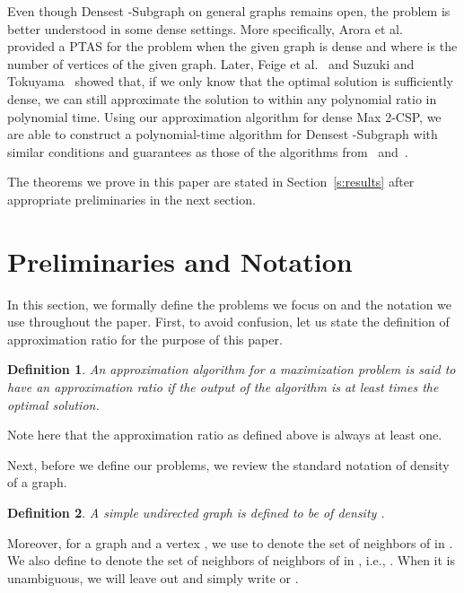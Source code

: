 \documentclass{article}
\newtheorem{definition}{Definition}
\begin{document}
Even though {\sc Densest -Subgraph} on general graphs remains open, the problem is better understood in some dense settings. More specifically, Arora et al.~\cite{AKK95} provided a PTAS for the problem when the given graph is dense and  where  is the number of vertices of the given graph. Later, Feige et al.~\cite{FPK01} and Suzuki and Tokuyama~\cite{ST05} showed that, if we only know that the optimal solution is sufficiently dense, we can still approximate the solution to within any polynomial ratio in polynomial time. Using our approximation algorithm for dense {\sc Max 2-CSP}, we are able to construct a polynomial-time algorithm for {\sc Densest -Subgraph} with similar conditions and guarantees as those of the algorithms from~\cite{FPK01} and~\cite{ST05}.

The theorems we prove in this paper are stated in Section~\ref{s:results} after appropriate preliminaries in the next section.

\section{Preliminaries and Notation}

In this section, we formally define the problems we focus on and the notation we use throughout the paper. First, to avoid confusion, let us state the definition of approximation ratio for the purpose of this paper. \\

\begin{definition}
  An approximation algorithm for a maximization problem is said to have an approximation ratio  if the output of the algorithm is at least  times the optimal solution.
\end{definition}

Note here that the approximation ratio as defined above is always at least one.

Next, before we define our problems, we review the standard notation of density of a graph. \\

\begin{definition}
  A simple undirected graph  is defined to be of density .
\end{definition}

Moreover, for a graph  and a vertex , we use  to denote the set of neighbors of  in . We also define  to denote the set of neighbors of neighbors of  in , i.e., . When it is unambiguous, we will leave out  and simply write  or .
\end{document}
